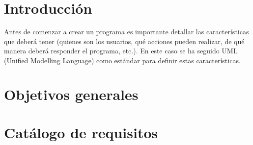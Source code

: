 \setcounter{ncu}{0}
\newcommand{\cu}[9]{
    \addtocounter{ncu}{1}

    \begin{table}[p]
        \centering
        \begin{tabularx}{\linewidth}{ p{0.21\columnwidth} p{0.71\columnwidth} }
            \toprule
            \textbf{CU-\arabic{ncu}}      & \textbf{#1} \\
            \toprule
            \textbf{Versión}              & #2          \\
            \textbf{Autor}                & \theauthor  \\
            \textbf{Requisitos asociados} & #3          \\
            \textbf{Descripción}          & #4          \\
            \textbf{Precondición}         & #5          \\
            \textbf{Acciones}             & #6          \\
            \textbf{Postcondición}        & #7          \\
            \textbf{Excepciones}          & #8          \\
            \textbf{Importancia}          & #9          \\
            \bottomrule
        \end{tabularx}
        \caption{CU-\arabic{ncu} #1.}
    \end{table}
}


\label{cha:Especificación de Requisitos}

\section{Introducción}

Antes de comenzar a crear un programa es importante detallar las características
que deberá tener (quienes son los usuarios, qué acciones pueden realizar, de qué
manera deberá responder el programa, etc.). En este caso se ha seguido UML
(Unified Modelling Language) como estándar para definir estas características.

\section{Objetivos generales}

\section{Catálogo de requisitos}

